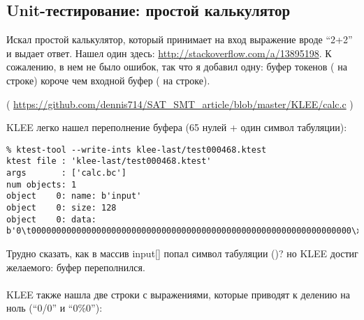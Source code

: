 \subsection{Unit-тестирование: простой калькулятор}

Искал простой калькулятор, который принимает на вход выражение вроде ``2+2'' и выдает ответ.
Нашел один здесь: \url{http://stackoverflow.com/a/13895198}.
К сожалению, в нем не было ошибок, так что я добавил одну: буфер токенов ( на строке) короче чем входной буфер ( на строке).


( \url{https://github.com/dennis714/SAT_SMT_article/blob/master/KLEE/calc.c} )

KLEE легко нашел переполнение буфера (65 нулей + один символ табуляции):

\begin{lstlisting}
% ktest-tool --write-ints klee-last/test000468.ktest
ktest file : 'klee-last/test000468.ktest'
args       : ['calc.bc']
num objects: 1
object    0: name: b'input'
object    0: size: 128
object    0: data: b'0\t0000000000000000000000000000000000000000000000000000000000000000\xff\xff\xff\xff\xff\xff\xff\xff\xff\xff\xff\xff\xff\xff\xff\xff\xff\xff\xff\xff\xff\xff\xff\xff\xff\xff\xff\xff\xff\xff\xff\xff\xff\xff\xff\xff\xff\xff\xff\xff\xff\xff\xff\xff\xff\xff\xff\xff\xff\xff\xff\xff\xff\xff\xff\xff\xff\xff\xff\xff\xff\xff'
\end{lstlisting}

Трудно сказать, как в массив input[] попал символ табуляции ()? но KLEE достиг желаемого: буфер переполнился.\\
\\
KLEE также нашла две строки с выражениями, которые приводят к делению на ноль (``0/0'' и ``0\%0''):

